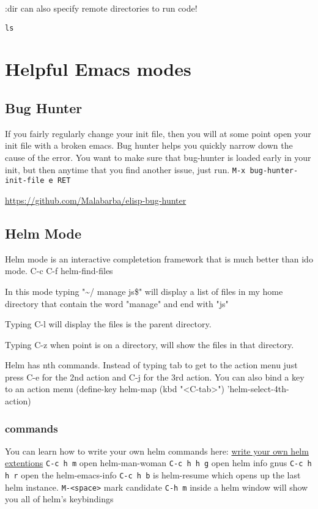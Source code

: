 \documentclass[11pt]{article}
\begin{document}
:dir can also specify remote directories to run code!
\begin{verbatim}
ls
\end{verbatim}

\section{Helpful Emacs modes}
\label{sec:orgheadline31}
\subsection{Bug Hunter}
\label{sec:orgheadline22}
If you fairly regularly change your init file, then you will at some point open your init file with a broken emacs.  Bug hunter helps you quickly narrow down the cause of the error.  You want to make sure that bug-hunter is loaded early in your init, but then anytime that you find another issue, just run.
  \texttt{M-x bug-hunter-init-file e RET}

\url{https://github.com/Malabarba/elisp-bug-hunter}
\subsection{Helm Mode}
\label{sec:orgheadline6}
Helm mode is an interactive completetion framework that is much better than ido mode.
  C-c C-f helm-find-files

In this mode typing "\textasciitilde{}/ manage js\$"
will display a list of files in my home directory that contain the word "manage" and end with "js"

Typing C-l will display the files is the parent directory.

Typing C-z when point is on a directory, will show the files in that directory.

Helm has nth commands. Instead of typing tab to get to the action menu
just press C-e for the 2nd action
and C-j for the 3rd action.
You can also bind a key to an action menu
(define-key helm-map (kbd "<C-tab>") 'helm-select-4th-action)

\subsubsection{commands}
\label{sec:orgheadline23}
You can learn how to write your own helm commands here: \href{http://wikemacs.org/wiki/How_to_write_helm_extensions}{write your own helm extentions}
  \texttt{C-c h m}  open helm-man-woman
  \texttt{C-c h h g} open helm info gnus
  \texttt{C-c h h r} open the helm-emacs-info
  \texttt{C-c h b} is helm-resume which opens up the last helm instance.
  \texttt{M-<space>} mark candidate
  \texttt{C-h m} inside a helm window will show you all of helm's keybindings
\end{document}
